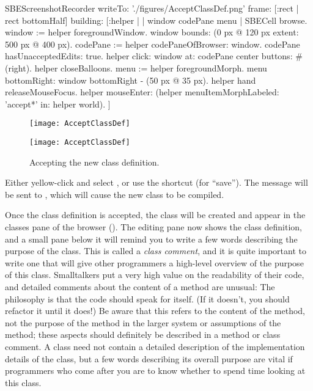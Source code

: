 \documentclass[a4paper,10pt,twoside]{book}
\begin{document}
\begin{ExecuteSmalltalkScript}
SBEScreenshotRecorder writeTo: './figures/AcceptClassDef.png' frame: [:rect | rect bottomHalf] building: [:helper |
	| window codePane menu |
	SBECell browse.
	window := helper foregroundWindow.
	window bounds: (0 px @ 120 px extent: 500 px @ 400 px).
	codePane := helper codePaneOfBrowser: window.
	codePane hasUnacceptedEdits: true.
	helper click: window at: codePane center buttons: #(right).
	helper closeBalloons.
	menu := helper foregroundMorph.
	menu bottomRight: window bottomRight - (50 px @ 35 px).
	helper hand releaseMouseFocus.
	helper mouseEnter: (helper menuItemMorphLabeled: 'accept*' in: helper world).
]
\end{ExecuteSmalltalkScript}
\begin{figure}[h!t]
\ifluluelse
	{\centerline {\texttt{[image: AcceptClassDef]}}}
	{\centerline {\texttt{[image: AcceptClassDef]}}}
\caption{Accepting the new class definition.
\label{fig:acceptClassDef}}
\end{figure}

Either yellow-click and select , or use the shortcut  (for ``save'').
The message will be sent to , which will cause the new class to be compiled.

Once the class definition is accepted, the class will be created and appear in the classes pane of the browser ().
The editing pane now shows the class definition, and a small pane below it will remind you to write a few words describing the purpose of the class.
This is called a \emph{class comment}, and it is quite important to write one that will give other programmers a high-level overview of the purpose of this class.
Smalltalkers put a very high value on the readability of their code, and detailed comments about the content of a method are unusual:
The philosophy is that the code should speak for itself.
(If it doesn't, you should refactor it until it does!)
Be aware that this refers to the content of the method, not the purpose of the method in the larger system or assumptions of the method; these aspects should definitely be described in a method or class comment.
A class  need not contain a detailed description of the implementation details of the class, but a few words describing its overall purpose are vital if programmers who come after you are to know whether to spend time looking at this class.
\end{document}
